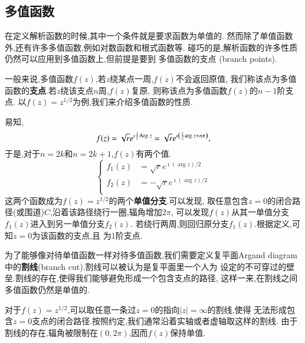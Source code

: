 \subsection{多值函数}
在定义解析函数的时候,其中一个条件就是要求函数为单值的.
然而除了单值函数外,还有许多多值函数,例如对数函数和根式函数等.
碰巧的是,解析函数的许多性质仍然可以应用到多值函数上,但前提是要到
多值函数的支点 (branch points).

一般来说,多值函数$f(z)$,若$z$绕某点一周,$f(z)$不会返回原值,
我们称该点为多值函数的\textbf{支点}.若$z$绕该支点$n$周,$f(z)$复原,
则称该点为多值函数$f(z)$的$n-1$阶支点.
以$f(z) = z^{1/2}$为例,我们来介绍多值函数的性质.

易知,\[
    f(z) = \sqrt{r} e^{\imath {\frac{1}{2}}  {\mathrm{Arg}\;} z}
    =  \sqrt{r} e^{\imath \left( {\frac{1}{2}} {\mathrm{arg}\;} z + n \pi \right)},
    \]
于是,对于$n= 2k$和$n=2k+1$,$f(z)$有两个值.
\begin{equation}
    \left\{\begin{aligned}
    f_1(z) & =\sqrt{r}  e^{\imath(\arg z) / 2} \\
    f_2(z) & =-\sqrt{r}  e^{\imath(\arg z) / 2} \\
    \end{aligned}\right.
\end{equation}
这两个函数成为$f(z)= z^{1/2}$的两个\textbf{单值分支}.可以发现,
取任意包含$z=0$的闭合路径(或围道)$C$,沿着该路径绕行一圈,辐角增加$2\pi$,
可以发现$f(z)$从其一单值分支$f_1(z)$进入到另一单值分支$f_2(z)$.
若绕行两周,则回归原分支$f_1(z)$.根据定义,可知$z=0$为该函数的支点,且
为1阶支点.

为了能够像对待单值函数一样对待多值函数,我们需要定义复平面Argand diagram
中的\textbf{割线}(branch cut).割线可以被认为是复平面里一个人为
设定的不可穿过的壁垒.割线的存在,使得我们能够避免形成一个包含支点的路径,
这样一来,在割线之间多值函数仍然是单值的.

对于$f(z)=z^{1/2}$,可以取任意一条过$z=0$的指向$|z|=\infty$的割线,使得
无法形成包含$z=0$支点的闭合路径.按照约定,我们通常沿着实轴或者虚轴取这样的割线.
由于割线的存在,辐角被限制在$(0,2\pi)$,因而$f(z)$保持单值.

